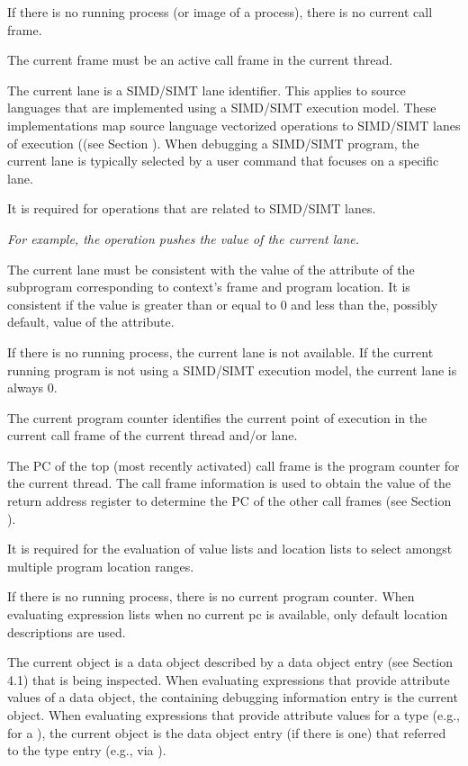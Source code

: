 \begin{enumerate}[1. ]
If there is no running process (or image of a process), there is no
current call frame.

The current frame must be an active call frame in the current thread.


The current lane is a SIMD/SIMT lane identifier. This applies to
source languages that are implemented using a SIMD/SIMT execution
model. These implementations map source language vectorized operations
to SIMD/SIMT lanes of execution ((see Section
). When debugging
a SIMD/SIMT program, the current lane is typically selected by a user
command that focuses on a specific lane.

It is required for operations that are related to SIMD/SIMT lanes.

\textit{For example, the \DWOPpushlane operation pushes the value of
  the current lane.}

The current lane must be consistent with the value of the
\DWATnumlanes attribute of the subprogram corresponding to context’s
frame and program location. It is consistent if the value is greater
than or equal to 0 and less than the, possibly default, value of the
\DWATnumlanes attribute.

If there is no running process, the current lane is not available. If
the current running program is not using a SIMD/SIMT execution model,
the current lane is always 0.

The current program counter identifies the current point of execution
in the current call frame of the current thread and/or lane.

The PC of the top (most recently activated) call frame is the program
counter for the current thread. The call frame information is used to
obtain the value of the return address register to determine the PC of
the other call frames (see Section
).

It is required for the evaluation of value lists and location lists to
select amongst multiple program location ranges.

If there is no running process, there is no current program
counter. When evaluating expression lists when no current pc is
available, only default location descriptions are used.


The current object is a data object described by a data object entry
(see Section 4.1) that is being inspected. When evaluating expressions
that provide attribute values of a data object, the containing
debugging information entry is the current object. When evaluating
expressions that provide attribute values for a type (e.g.,
\DWATdatalocation for a \DWTAGmember), the current object is the data
object entry (if there is one) that referred to the type entry (e.g.,
via \DWATtype).


\end{enumerate}
